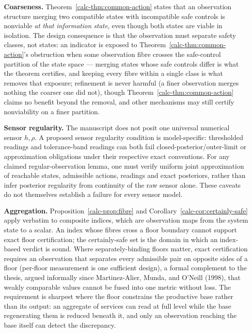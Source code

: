 \documentclass[10pt,twocolumn]{article}
\theoremstyle{definition}
\begin{document}
\textbf{Coarseness.} Theorem~\ref{calc-thm:common-action} states that an observation structure
merging two compatible states with incompatible safe controls is
nonviable \emph{at that information state}, even though both states are
viable in isolation. The design consequence is that the observation must
separate safety classes, not states: an indicator is exposed to Theorem~\ref{calc-thm:common-action}'s obstruction when some observation fibre crosses the safe-control
partition of the state space --- merging states whose safe controls differ is what the theorem certifies, and keeping every fibre within a single class is what removes that exposure; refinement is never harmful (a finer observation merges nothing the coarser one did not), though Theorem~\ref{calc-thm:common-action}
claims no benefit beyond the removal, and other mechanisms may still
certify nonviability on a finer partition.

\textbf{Sensor regularity.} The manuscript does not posit one universal numerical sensor \(h,\rho\). A proposed sensor regularity condition is model-specific: thresholded readings and tolerance-band readings can both fail closed-posterior/outer-limit or approximation obligations under their respective exact conventions. For any claimed regular-observation lemma, one must verify uniform joint approximation of reachable states, admissible actions, readings and exact posteriors, rather than infer posterior regularity from continuity of the raw sensor alone. These caveats do not themselves establish a failure for every sensor model.

\textbf{Aggregation.} Proposition~\ref{calc-prop:fibre} and Corollary~\ref{calc-cor:certainly-safe} apply verbatim to
composite indices, which are observation maps from the system state to a
scalar. An index whose fibres cross a floor boundary cannot support
exact floor certification; the certainly-safe set is the domain in which an index-based verdict is sound. Where separately-binding floors matter, exact
certification requires an observation that separates every admissible
pair on opposite sides of a floor (per-floor measurement is one sufficient design), a formal complement to the thesis, argued informally since Martinez-Alier, Munda, and O'Neill (1998), that weakly comparable
values cannot be fused into one metric without loss. The requirement is
sharpest where the floor constrains the productive base rather than its
output: an aggregate of services can read at full level while the base
regenerating them is reduced beneath it, and only an observation
reaching the base itself can detect the discrepancy.
\end{document}
